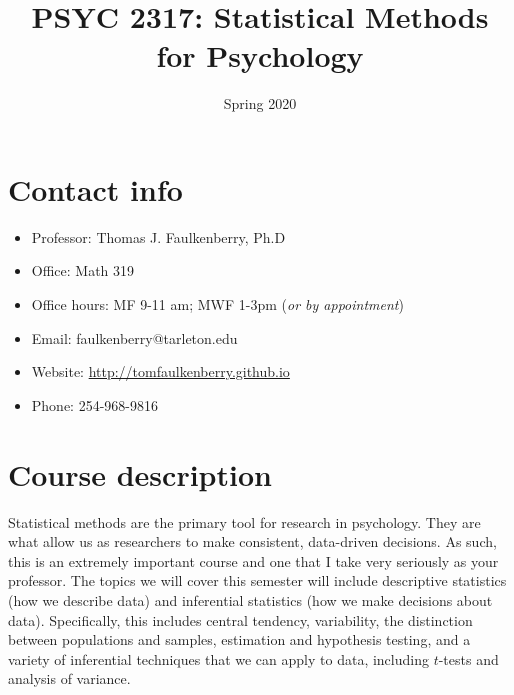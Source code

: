 \documentclass[10pt]{article}
\date{Spring 2020}
\title{PSYC 2317: Statistical Methods for Psychology}
\begin{document}
\maketitle

\section*{Contact info}
\label{sec:org34b675f}
\begin{itemize}
\item Professor: Thomas J. Faulkenberry, Ph.D
\item Office: Math 319
\item Office hours: MF 9-11 am; MWF 1-3pm (\emph{or by appointment})
\item Email: faulkenberry@tarleton.edu
\item Website: \url{http://tomfaulkenberry.github.io}
\item Phone: 254-968-9816
\end{itemize}

\section*{Course description}
\label{sec:org45fe6f8}

Statistical methods are the primary tool for research in psychology. They are what allow us as researchers to make consistent, data-driven decisions.  As such, this is an extremely important course and one that I take very seriously as your professor. The topics we will cover this semester will include descriptive statistics (how we describe data) and inferential statistics (how we make decisions about data).  Specifically, this includes central tendency, variability, the distinction between populations and samples, estimation and hypothesis testing, and a variety of inferential techniques that we can apply to data, including \(t\)-tests and analysis of variance.
\end{document}
